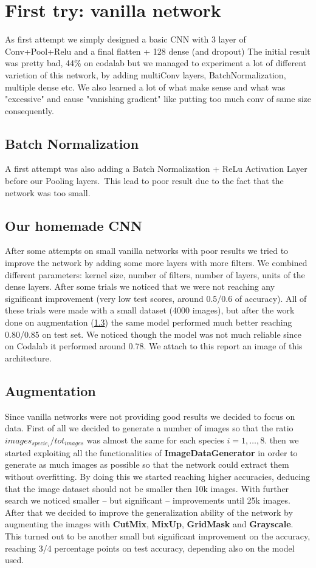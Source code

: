 \documentclass[11pt]{article}
\begin{document}
\section{First try: vanilla network}
As first attempt we simply designed a basic CNN with 3 layer of Conv+Pool+Relu and a final flatten + 128 dense (and dropout)
The initial result was pretty bad, 44\% on codalab but we managed to experiment a lot of different varietion of this network, by adding multiConv layers, BatchNormalization, multiple dense etc.
We also learned a lot of what make sense and what was "excessive" and cause "vanishing gradient" like putting too much conv of same size consequently.
\subsection{Batch Normalization}
A first attempt was also adding a Batch Normalization + ReLu Activation Layer before our Pooling layers.\
This lead to poor result due to the fact that the network was too small.

\subsection{Our homemade CNN}
After some attempts on small vanilla networks with poor results we tried to improve the network by adding some more layers with more filters.
We combined different parameters: kernel size, number of filters, number of layers, units of the dense layers.
After some trials we noticed that we were not reaching any significant improvement (very low test scores, around 0.5/0.6 of accuracy).
All of these trials were made with a small dataset (4000 images), but after the work done on augmentation (\ref{subsec:augmentation}) the same model performed much better reaching 0.80/0.85 on test set.
We noticed though the model was not much reliable since on Codalab it performed around 0.78.
We attach to this report an image of this architecture.

\subsection{Augmentation}\label{subsec:augmentation}
Since vanilla networks were not providing good results we decided to focus on data.
First of all we decided to generate a number of images so that the ratio $images_{specie_i}/tot_{images}$ was almost the same for each species $i=1,\dots,8$.
then we started exploiting all the functionalities of \textbf{ImageDataGenerator} in order to generate as much images as possible so that the network could extract them without overfitting.
By doing this we started reaching higher accuracies, deducing that the image dataset should not be smaller then 10k images.
With further search we noticed smaller -- but significant -- improvements until 25k images.
After that we decided to improve the generalization ability of the network by augmenting the images with \textbf{CutMix}, \textbf{MixUp}, \textbf{GridMask} and \textbf{Grayscale}.
This turned out to be another small but significant improvement on the accuracy, reaching 3/4 percentage points on test accuracy, depending also on the model used.
\end{document}
